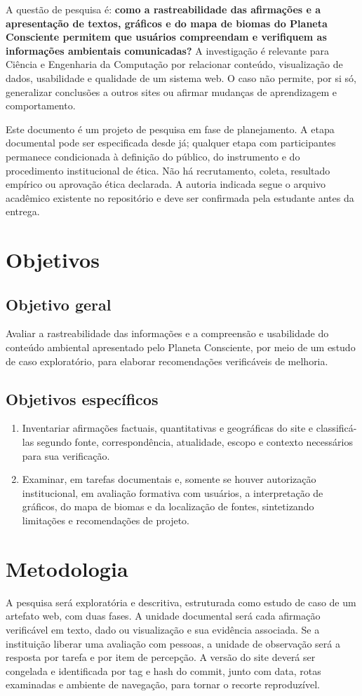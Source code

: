 \documentclass[12pt,oneside,a4paper,brazil]{abntex2}
\begin{document}
A questão de pesquisa é: \textbf{como a rastreabilidade das afirmações e a apresentação de textos, gráficos e do mapa de biomas do Planeta Consciente permitem que usuários compreendam e verifiquem as informações ambientais comunicadas?} A investigação é relevante para Ciência e Engenharia da Computação por relacionar conteúdo, visualização de dados, usabilidade e qualidade de um sistema web. O caso não permite, por si só, generalizar conclusões a outros sites ou afirmar mudanças de aprendizagem e comportamento.

Este documento é um projeto de pesquisa em fase de planejamento. A etapa documental pode ser especificada desde já; qualquer etapa com participantes permanece condicionada à definição do público, do instrumento e do procedimento institucional de ética. Não há recrutamento, coleta, resultado empírico ou aprovação ética declarada. A autoria indicada segue o arquivo acadêmico existente no repositório e deve ser confirmada pela estudante antes da entrega.

\section{Objetivos}
\subsection{Objetivo geral}
Avaliar a rastreabilidade das informações e a compreensão e usabilidade do conteúdo ambiental apresentado pelo Planeta Consciente, por meio de um estudo de caso exploratório, para elaborar recomendações verificáveis de melhoria.

\subsection{Objetivos específicos}
\begin{enumerate}
\item Inventariar afirmações factuais, quantitativas e geográficas do site e classificá-las segundo fonte, correspondência, atualidade, escopo e contexto necessários para sua verificação.
\item Examinar, em tarefas documentais e, somente se houver autorização institucional, em avaliação formativa com usuários, a interpretação de gráficos, do mapa de biomas e da localização de fontes, sintetizando limitações e recomendações de projeto.
\end{enumerate}

\section{Metodologia}
A pesquisa será exploratória e descritiva, estruturada como estudo de caso de um artefato web, com duas fases. A unidade documental será cada afirmação verificável em texto, dado ou visualização e sua evidência associada. Se a instituição liberar uma avaliação com pessoas, a unidade de observação será a resposta por tarefa e por item de percepção. A versão do site deverá ser congelada e identificada por tag e hash do commit, junto com data, rotas examinadas e ambiente de navegação, para tornar o recorte reproduzível.
\end{document}

